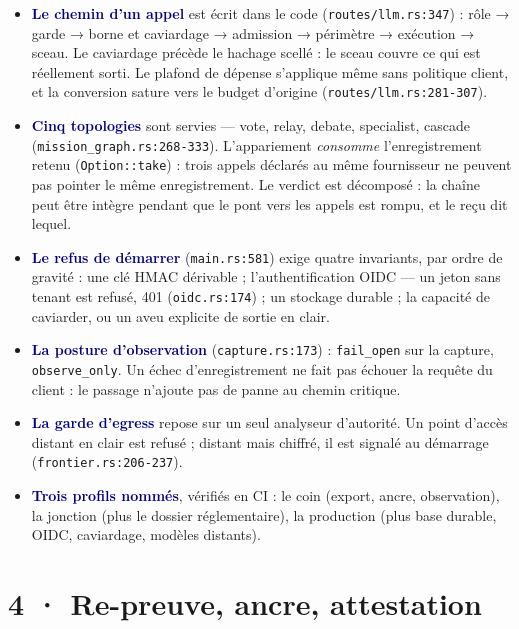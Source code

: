\documentclass[10pt]{extarticle}
\newcommand{\code}[1]{\texttt{\small #1}}
\newcommand{\loc}[1]{{\footnotesize\color{grey}\texttt{#1}}}
\newcommand{\mm}[1]{\textbf{\textcolor{navy}{#1}}}
\begin{document}
\begin{itemize}[leftmargin=1.2em,itemsep=1.5pt,topsep=1pt]
\item \mm{Le chemin d'un appel} est écrit dans le code (\loc{routes/\allowbreak llm.rs:347}) : rôle → garde → borne
et caviardage → admission → périmètre → exécution → sceau. Le caviardage précède le hachage scellé : le sceau couvre
ce qui est réellement sorti. Le plafond de dépense s'applique même sans politique client, et la conversion sature vers
le budget d'origine (\loc{routes/\allowbreak llm.rs:281-307}).
\item \mm{Cinq topologies} sont servies --- vote, relay, debate, specialist, cascade (\loc{mission\_graph.rs:268-333}).
L'appariement \emph{consomme} l'enregistrement retenu (\code{Option::take}) : trois appels déclarés au même fournisseur
ne peuvent pas pointer le même enregistrement. Le verdict est décomposé : la chaîne peut être intègre pendant que le
pont vers les appels est rompu, et le reçu dit lequel.
\item \mm{Le refus de démarrer} (\loc{main.rs:581}) exige quatre invariants, par ordre de gravité : une clé HMAC
dérivable ; l'authentification OIDC --- un jeton sans tenant est refusé, 401 (\loc{oidc.rs:174}) ; un stockage durable
; la capacité de caviarder, ou un aveu explicite de sortie en clair.
\item \mm{La posture d'observation} (\loc{capture.rs:173}) : \code{fail\_open} sur la capture, \code{observe\_only}.
Un échec d'enregistrement ne fait pas échouer la requête du client : le passage n'ajoute pas de panne au chemin
critique.
\item \mm{La garde d'egress} repose sur un seul analyseur d'autorité. Un point d'accès distant en clair est refusé ;
distant mais chiffré, il est signalé au démarrage (\loc{frontier.rs:206-237}).
\item \mm{Trois profils nommés}, vérifiés en CI : le coin (export, ancre, observation), la jonction (plus le dossier
réglementaire), la production (plus base durable, OIDC, caviardage, modèles distants).
\end{itemize}

\section{4 · Re-preuve, ancre, attestation}
\end{document}
